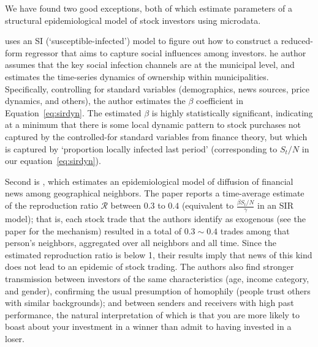 We have found two good exceptions, both of which estimate parameters of a structural epidemiological model of stock investors using microdata.

\href{https://github.com/iworld1991/EpiExp/blob/master/Literature/shive2010epidemic.pdf}{\cite{shive2010epidemic}} uses an SI (`susceptible-infected') model to figure out how to construct a reduced-form regressor that aims to capture social influences among investors.  he author assumes that the key social infection channels are at the municipal level, and estimates the time-series dynamics of ownership within municipalities.  Specifically, controlling for standard variables (demographics, news sources, price dynamics, and others), the author estimates the $\beta$ coefficient in Equation~\eqref{eq:sirdyn}.  The estimated $\beta$ is highly statistically significant, indicating at a minimum that there is some local dynamic pattern to stock purchases not captured by the controlled-for standard variables from finance theory, but which is captured by `proportion locally infected last period' (corresponding to $S_t/N$ in our equation~\eqref{eq:sirdyn}).

Second is \href{https://github.com/iworld1991/EpiExp/blob/master/Literature/huang2021rate.pdf}{ \cite{huang2021rate}}, which estimates an epidemiological model of diffusion of financial news among geographical neighbors. The paper reports a time-average estimate of the reproduction ratio $\mathcal{R}$ between $0.3$ to $0.4$ (equivalent to $\frac{\beta S_t/N}{\gamma}$ in an SIR model); that is, each stock trade that the authors identify as exogenous (see the paper for the mechanism) resulted in a total of $0.3{\sim}0.4$ trades among that person's neighbors, aggregated over all neighbors and all time.  Since the estimated reproduction ratio is below  1, their results imply that news of this kind does not lead to an epidemic of stock trading.    The authors also find stronger transmission between investors of the same characteristics (age, income category, and gender), confirming the usual presumption of homophily (people trust others with similar backgrounds); and between senders and receivers with high past performance, the natural interpretation of which is that you are more likely to boast about your investment in a winner than admit to having invested in a loser.

